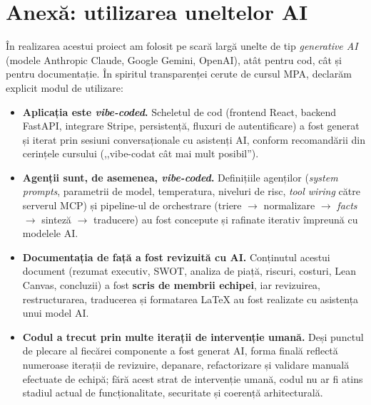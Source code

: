 \section*{Anexă: utilizarea uneltelor AI}

În realizarea acestui proiect am folosit pe scară largă unelte de tip \textit{generative AI} (modele Anthropic Claude, Google Gemini, OpenAI), atât pentru cod, cât și pentru documentație. În spiritul transparenței cerute de cursul MPA, declarăm explicit modul de utilizare:

\begin{itemize}
    \item \textbf{Aplicația este \textit{vibe-coded}.} Scheletul de cod (frontend React, backend FastAPI, integrare Stripe, persistență, fluxuri de autentificare) a fost generat și iterat prin sesiuni conversaționale cu asistenți AI, conform recomandării din cerințele cursului (,,vibe-codat cât mai mult posibil'').
    \item \textbf{Agenții sunt, de asemenea, \textit{vibe-coded}.} Definițiile agenților (\textit{system prompts}, parametrii de model, temperatura, niveluri de risc, \textit{tool wiring} către serverul MCP) și pipeline-ul de orchestrare (triere $\rightarrow$ normalizare $\rightarrow$ \textit{facts} $\rightarrow$ sinteză $\rightarrow$ traducere) au fost concepute și rafinate iterativ împreună cu modelele AI.
    \item \textbf{Documentația de față a fost revizuită cu AI.} Conținutul acestui document (rezumat executiv, SWOT, analiza de piață, riscuri, costuri, Lean Canvas, concluzii) a fost \textbf{scris de membrii echipei}, iar revizuirea, restructurarea, traducerea și formatarea LaTeX au fost realizate cu asistența unui model AI.
    \item \textbf{Codul a trecut prin multe iterații de intervenție umană.} Deși punctul de plecare al fiecărei componente a fost generat AI, forma finală reflectă numeroase iterații de revizuire, depanare, refactorizare și validare manuală efectuate de echipă; fără acest strat de intervenție umană, codul nu ar fi atins stadiul actual de funcționalitate, securitate și coerență arhitecturală.
\end{itemize}

